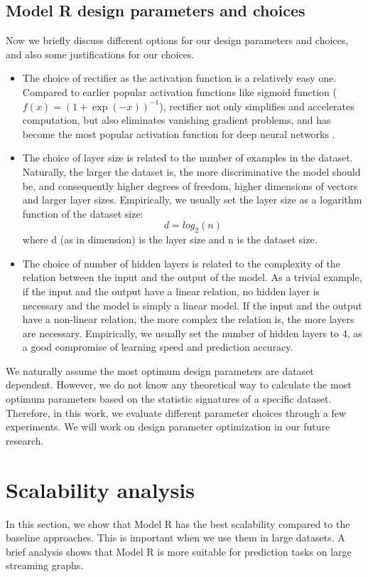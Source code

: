 \documentclass[12pt]{WSUThesis}
\theoremstyle{definition}
\begin{document}
\subsection{Model R design parameters and choices}
Now we briefly discuss different options for our design parameters and choices,
and also some justifications for our choices.
\begin{itemize}
	\item The choice of rectifier as the activation function is a relatively easy one.
	Compared to earlier popular activation functions like sigmoid function
	($ f(x) = (1 + \exp(-x))^{-1} $),
	rectifier not only simplifies and accelerates computation,
	but also eliminates vanishing gradient problems,
	and has become the most popular activation function
	for deep neural networks \cite{lecun2015deep}.
	\item The choice of layer size is related to
	the number of examples in the dataset.
	Naturally, the larger the dataset is,
	the more discriminative the model should be,
	and consequently higher degrees of freedom,
	higher dimensions of vectors and larger layer sizes.
	Empirically, we usually set the layer size as a logarithm function of the dataset size:
	\[d = log_2(n)\]
	where d (as in dimension) is the layer size and n is the dataset size.
	\item The choice of number of hidden layers is related to the complexity of the relation between the input and the output of the model.
	As a trivial example, if the input and the output have a linear relation,
	no hidden layer is necessary and the model is simply a linear model.
	If the input and the output have a non-linear relation,
	the more complex the relation is, the more layers are necessary.
	Empirically, we usually set the number of hidden layers to 4,
	as a good compromise of learning speed and prediction accuracy.
\end{itemize}
We naturally assume the most optimum design parameters are dataset dependent.
However, we do not know any theoretical way to calculate the most optimum parameters based on the statistic signatures of a specific dataset.
Therefore, in this work, we evaluate different parameter choices through a few experiments.
We will work on design parameter optimization in our future research.

\section{Scalability analysis}
In this section, we show that Model R has the best scalability compared to the baseline approaches. This is important when we use them in large datasets. A brief analysis shows that Model R is more suitable for prediction tasks on large streaming graphs.
\end{document}
